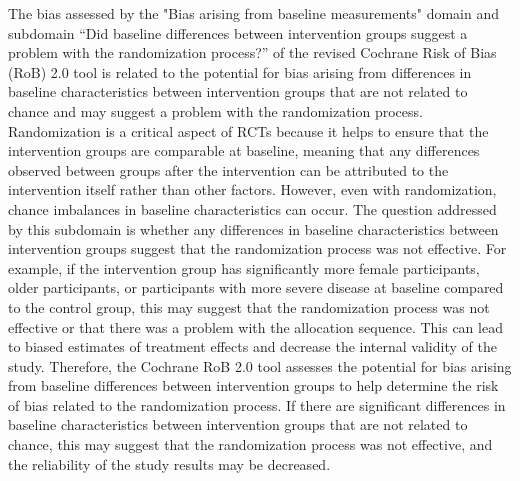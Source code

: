 \documentclass[sn-mathphys,Numbered]{sn-jnl}%
\begin{document}
The bias assessed by the "Bias arising from baseline measurements" domain and subdomain ``Did baseline differences between intervention groups suggest a problem with the randomization process?'' of the revised Cochrane Risk of Bias (RoB) 2.0 tool is related to the potential for bias arising from differences in baseline characteristics between intervention groups that are not related to chance and may suggest a problem with the randomization process.
Randomization is a critical aspect of RCTs because it helps to ensure that the intervention groups are comparable at baseline, meaning that any differences observed between groups after the intervention can be attributed to the intervention itself rather than other factors.
However, even with randomization, chance imbalances in baseline characteristics can occur.
The question addressed by this subdomain is whether any differences in baseline characteristics between intervention groups suggest that the randomization process was not effective.
For example, if the intervention group has significantly more female participants, older participants, or participants with more severe disease at baseline compared to the control group, this may suggest that the randomization process was not effective or that there was a problem with the allocation sequence.
This can lead to biased estimates of treatment effects and decrease the internal validity of the study.
Therefore, the Cochrane RoB 2.0 tool assesses the potential for bias arising from baseline differences between intervention groups to help determine the risk of bias related to the randomization process.
If there are significant differences in baseline characteristics between intervention groups that are not related to chance, this may suggest that the randomization process was not effective, and the reliability of the study results may be decreased.
\end{document}
